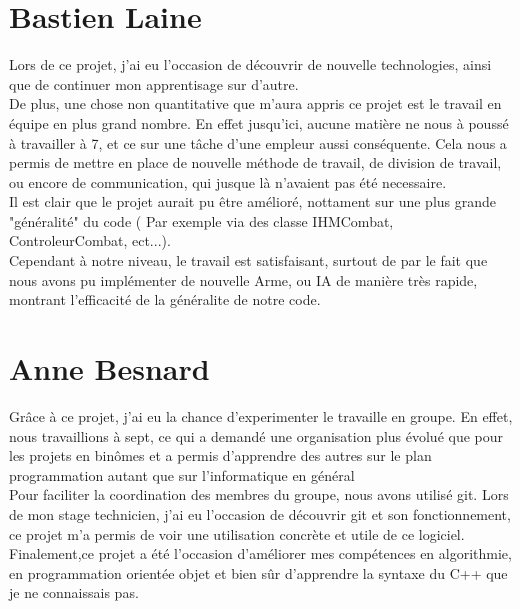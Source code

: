     \section{Bastien Laine}
        Lors de ce projet, j'ai eu l'occasion de découvrir de nouvelle technologies, ainsi que de continuer mon apprentisage sur d'autre. \\
        De plus, une chose non quantitative que m'aura appris ce projet est le travail en équipe en plus grand nombre. En effet jusqu'ici, aucune matière ne nous à poussé à travailler à 7, et ce sur une tâche d'une empleur aussi conséquente. Cela nous a permis de mettre en place de nouvelle méthode de travail, de division de travail, ou encore de communication, qui jusque là n'avaient pas été necessaire. \\
        Il est clair que le projet aurait pu être amélioré, nottament sur une plus grande "généralité" du code ( Par exemple via des classe IHMCombat, ControleurCombat, ect...). \\
        Cependant à notre niveau, le travail est satisfaisant, surtout de par le fait que nous avons pu implémenter de nouvelle Arme, ou IA de manière très rapide, montrant l'efficacité de la généralite de notre code.


\section{Anne Besnard}


	Grâce à ce projet, j'ai eu la chance d'experimenter le travaille en groupe. En effet, nous travaillions à sept, ce qui a demandé une organisation plus évolué que pour les projets en binômes et a permis d'apprendre des autres sur le plan programmation autant que sur l'informatique en général\\
	Pour faciliter la coordination des membres du groupe,  nous avons utilisé git. Lors de mon stage technicien, j'ai eu l'occasion de découvrir git et son fonctionnement, ce projet m'a permis de voir une utilisation concrète et utile de ce logiciel.\\
	Finalement,ce projet a été l'occasion d'améliorer mes compétences en algorithmie, en programmation orientée objet et bien sûr d'apprendre la syntaxe du C++ que je ne connaissais pas. 